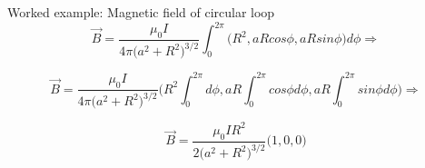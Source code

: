 {\begin{frame}{Worked example: Magnetic field of circular loop}
  \begin{equation*}
     \vec{B} = \frac{\mu_0 I}{4\pi \Big(a^2 + R^2 \Big)^{3/2}}
       \int_{0}^{2\pi} \Big(R^2, a R cos\phi, a R sin\phi \Big) d\phi
        \Rightarrow
  \end{equation*}

  \begin{equation*}
     \vec{B} = \frac{\mu_0 I}{4\pi \Big(a^2 + R^2 \Big)^{3/2}}
        \Big(R^2 \int_{0}^{2\pi} d\phi ,
             a R \int_{0}^{2\pi}  cos\phi d\phi ,
             a R \int_{0}^{2\pi}  sin\phi d\phi \Big)
        \Rightarrow
  \end{equation*}


  \begin{equation*}
     \vec{B} = \frac{\mu_0 I R^2}{2 \Big(a^2 + R^2 \Big)^{3/2}}
                    \Big(1, 0 , 0 \Big)
  \end{equation*}

\end{frame}

} %



%
%

